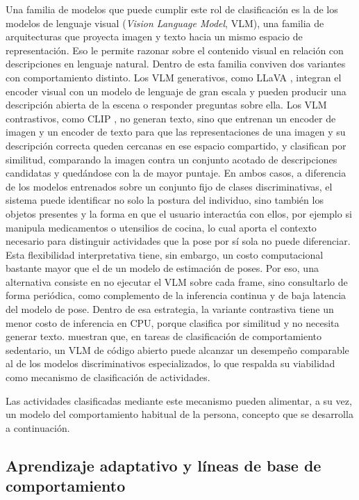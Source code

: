 Una familia de modelos que puede cumplir este rol de clasificación es la de los modelos de lenguaje visual (\textit{Vision Language Model}, VLM), una familia de arquitecturas que proyecta imagen y texto hacia un mismo espacio de representación.
Eso le permite razonar sobre el contenido visual en relación con descripciones en lenguaje natural.
Dentro de esta familia conviven dos variantes con comportamiento distinto.
Los VLM generativos, como LLaVA \parencite{Liu2023llava}, integran el encoder visual con un modelo de lenguaje de gran escala y pueden producir una descripción abierta de la escena o responder preguntas sobre ella.
Los VLM contrastivos, como CLIP \parencite{Radford2021}, no generan texto, sino que entrenan un encoder de imagen y un encoder de texto para que las representaciones de una imagen y su descripción correcta queden cercanas en ese espacio compartido, y clasifican por similitud, comparando la imagen contra un conjunto acotado de descripciones candidatas y quedándose con la de mayor puntaje.
En ambos casos, a diferencia de los modelos entrenados sobre un conjunto fijo de clases discriminativas, el sistema puede identificar no solo la postura del individuo, sino también los objetos presentes y la forma en que el usuario interactúa con ellos, por ejemplo si manipula medicamentos o utensilios de cocina, lo cual aporta el contexto necesario para distinguir actividades que la pose por sí sola no puede diferenciar.
Esta flexibilidad interpretativa tiene, sin embargo, un costo computacional bastante mayor que el de un modelo de estimación de poses.
Por eso, una alternativa consiste en no ejecutar el VLM sobre cada frame, sino consultarlo de forma periódica, como complemento de la inferencia continua y de baja latencia del modelo de pose.
Dentro de esa estrategia, la variante contrastiva tiene un menor costo de inferencia en CPU, porque clasifica por similitud y no necesita generar texto.
\textcite{Schonfeldt2025} muestran que, en tareas de clasificación de comportamiento sedentario, un VLM de código abierto puede alcanzar un desempeño comparable al de los modelos discriminativos especializados, lo que respalda su viabilidad como mecanismo de clasificación de actividades.

Las actividades clasificadas mediante este mecanismo pueden alimentar, a su vez, un modelo del comportamiento habitual de la persona, concepto que se desarrolla a continuación.

\subsection{Aprendizaje adaptativo y líneas de base de comportamiento}
\label{sec:aprendizaje_adaptativo_marco}

